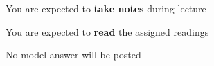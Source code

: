 \begin{frame}
\begin{center}
\large
You are expected to \textbf{take notes} during lecture
\end{center}
\end{frame}

\begin{frame}
\begin{center}
\large
You are expected to \textbf{read} the assigned readings
\end{center}
\end{frame}

\begin{cf}{
No model answer will be posted
}
\end{cf}

{%
\begin{frame}[plain]
\end{frame}

}
